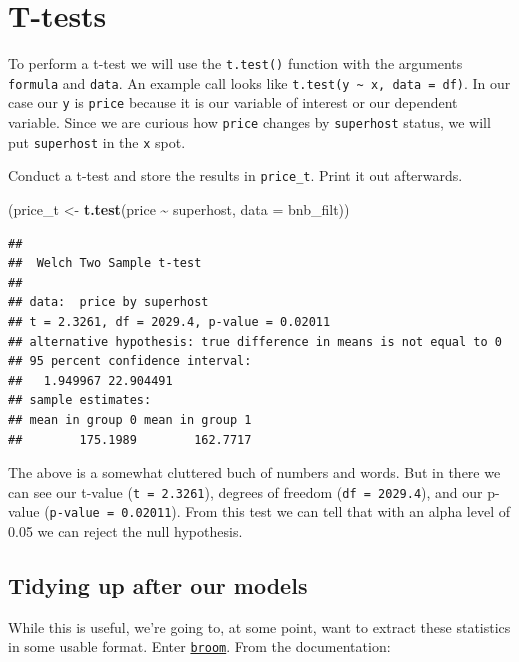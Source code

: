 \documentclass[
]{book}
\newenvironment{Shaded}{\begin{snugshade}}{\end{snugshade}}
\newcommand{\DataTypeTok}[1]{\textcolor[rgb]{0.13,0.29,0.53}{#1}}
\newcommand{\KeywordTok}[1]{\textcolor[rgb]{0.13,0.29,0.53}{\textbf{#1}}}
\newcommand{\NormalTok}[1]{#1}
\newcommand{\OperatorTok}[1]{\textcolor[rgb]{0.81,0.36,0.00}{\textbf{#1}}}
\newcommand{\StringTok}[1]{\textcolor[rgb]{0.31,0.60,0.02}{#1}}
\begin{document}
\hypertarget{t-tests}{%
\section{T-tests}\label{t-tests}}

To perform a t-test we will use the \texttt{t.test()} function with the arguments \texttt{formula} and \texttt{data}. An example call looks like \texttt{t.test(y\ \textasciitilde{}\ x,\ data\ =\ df)}. In our case our \texttt{y} is \texttt{price} because it is our variable of interest or our dependent variable. Since we are curious how \texttt{price} changes by \texttt{superhost} status, we will put \texttt{superhost} in the \texttt{x} spot.

Conduct a t-test and store the results in \texttt{price\_t}. Print it out afterwards.

\begin{Shaded}
\begin{Highlighting}[]
\NormalTok{(price\_t \textless{}{-}}\StringTok{ }\KeywordTok{t.test}\NormalTok{(price }\OperatorTok{\textasciitilde{}}\StringTok{ }\NormalTok{superhost, }\DataTypeTok{data =}\NormalTok{ bnb\_filt))}
\end{Highlighting}
\end{Shaded}

\begin{verbatim}
## 
##  Welch Two Sample t-test
## 
## data:  price by superhost
## t = 2.3261, df = 2029.4, p-value = 0.02011
## alternative hypothesis: true difference in means is not equal to 0
## 95 percent confidence interval:
##   1.949967 22.904491
## sample estimates:
## mean in group 0 mean in group 1 
##        175.1989        162.7717
\end{verbatim}

The above is a somewhat cluttered buch of numbers and words. But in there we can see our t-value (\texttt{t\ =\ 2.3261}), degrees of freedom (\texttt{df\ =\ 2029.4}), and our p-value (\texttt{p-value\ =\ 0.02011}). From this test we can tell that with an alpha level of 0.05 we can reject the null hypothesis.

\hypertarget{tidying-up-after-our-models}{%
\subsection{Tidying up after our models}\label{tidying-up-after-our-models}}

While this is useful, we're going to, at some point, want to extract these statistics in some usable format. Enter \href{https://broom.tidyverse.org/}{\texttt{broom}}. From the documentation:
\end{document}
